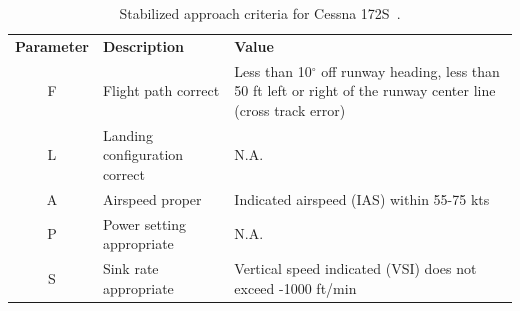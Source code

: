         \begin{table}
            \caption{\small{Stabilized approach criteria for Cessna 172S~\cite{und_flight_manual}.}} \label{tab:approach_thresholds}
            \vspace{3pt}
            \centering
            \begin{tabular}{@{} c >{\raggedright\arraybackslash} m{.3\linewidth} m{.42\linewidth} @{}}
                \hline\noalign{\smallskip}
                \bfseries Parameter & \bfseries Description & \bfseries Value \\
                \noalign{\smallskip}
                \hline
                \noalign{\smallskip}
                F & Flight path correct & Less than 10$^\circ$ off runway heading, less than 50 ft left or right of the runway center line (cross track error) \\ \hline
                L & Landing configuration correct & N.A. \\ \hline
                A & Airspeed proper & Indicated airspeed (IAS) within 55-75 kts \\ \hline
                P & Power setting appropriate & N.A. \\ \hline
                S & Sink rate appropriate & Vertical speed indicated (VSI) does not exceed -1000 ft/min \\ \hline
            \end{tabular}
        \end{table}
        
